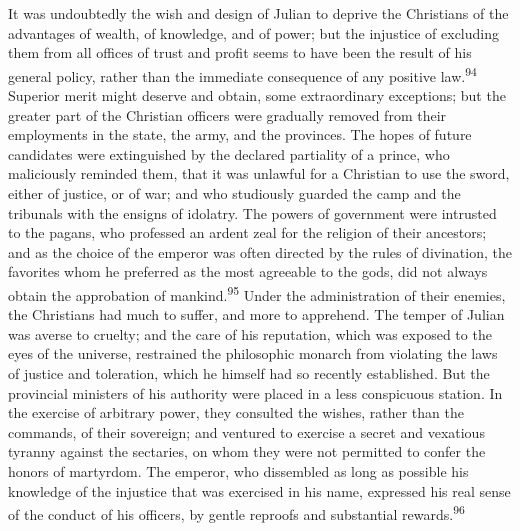 


It was undoubtedly the wish and design of Julian to deprive the
Christians of the advantages of wealth, of knowledge, and of
power; but the injustice of excluding them from all offices of
trust and profit seems to have been the result of his general
policy, rather than the immediate consequence of any positive
law.\textsuperscript{94} Superior merit might deserve and obtain, some
extraordinary exceptions; but the greater part of the Christian
officers were gradually removed from their employments in the
state, the army, and the provinces. The hopes of future
candidates were extinguished by the declared partiality of a
prince, who maliciously reminded them, that it was unlawful for a
Christian to use the sword, either of justice, or of war; and who
studiously guarded the camp and the tribunals with the ensigns of
idolatry. The powers of government were intrusted to the pagans,
who professed an ardent zeal for the religion of their ancestors;
and as the choice of the emperor was often directed by the rules
of divination, the favorites whom he preferred as the most
agreeable to the gods, did not always obtain the approbation of
mankind.\textsuperscript{95} Under the administration of their enemies, the
Christians had much to suffer, and more to apprehend. The temper
of Julian was averse to cruelty; and the care of his reputation,
which was exposed to the eyes of the universe, restrained the
philosophic monarch from violating the laws of justice and
toleration, which he himself had so recently established. But the
provincial ministers of his authority were placed in a less
conspicuous station. In the exercise of arbitrary power, they
consulted the wishes, rather than the commands, of their
sovereign; and ventured to exercise a secret and vexatious
tyranny against the sectaries, on whom they were not permitted to
confer the honors of martyrdom. The emperor, who dissembled as
long as possible his knowledge of the injustice that was
exercised in his name, expressed his real sense of the conduct of
his officers, by gentle reproofs and substantial rewards.\textsuperscript{96}

